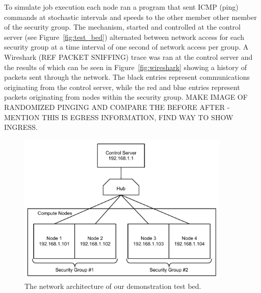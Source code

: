 \documentclass[oneside,12pt]{memoir}
\begin{document}
To simulate job execution each node ran a program that sent ICMP (ping) commands at stochastic intervals and speeds to the other member other member of the security group. The mechanism, started and controlled at the control server (see Figure~\ref{fig:test_bed}) alternated between network access for each security group at a time interval of one second of network access per group. A Wireshark (REF PACKET SNIFFING) trace was ran at the control server and the results of which can be seen in Figure~\ref{fig:wireshark} showing a history of packets sent through the network. The black entries represent communications originating from the control server, while the red and blue entries represent packets originating from nodes within the security group. MAKE IMAGE OF RANDOMIZED PINGING AND COMPARE THE BEFORE AFTER - MENTION THIS IS EGRESS INFORMATION, FIND WAY TO SHOW INGRESS.
\begin{figure}
  \begin{center}
    \includegraphics[width=0.9\textwidth]{tdm_demo_setup.pdf}
  \end{center}
  \caption{The network architecture of our demonstration test bed.}
\label{fig:tdm_demo_setup}
\end{figure}
\end{document}
